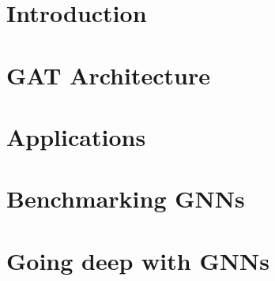 \documentclass[11pt,oneside]{book}
\begin{document}


\clearpage
\newpage

\chapter*{Introduction}


\chapter*{GAT Architecture}


\chapter*{Applications}


\chapter*{Benchmarking GNNs}


\chapter*{Going deep with GNNs}


\newpage
{}

\renewcommand\bibname{References}

\end{document}
